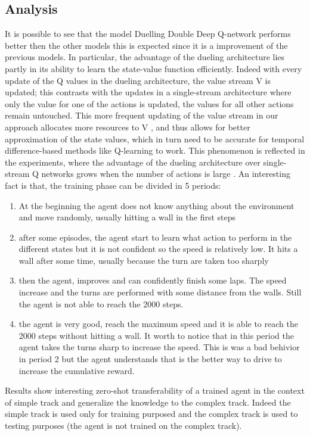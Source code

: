 \documentclass[14pt]{extarticle}
\def\sp{\vspace{5pt}}
\def\pp{\vspace{10pt}\newline}
\def\ppn{\vspace{10pt}}
\begin{document}
\begin{flushleft}
\subsection{Analysis}
\sp
It is possible to see that the model Duelling Double Deep Q-network performs better then the other models this is expected since it is a improvement of the previous models. 
\pp
In particular, the advantage of the dueling architecture lies partly in its ability to learn the state-value function efficiently. Indeed with every update of the Q values in the dueling architecture, the value stream V is updated; this contrasts with the updates in a single-stream architecture where only the value for one of the actions is updated, the values for all other actions remain untouched. This more frequent updating of the value stream in our approach allocates more resources to V , and thus allows for better approximation of the state values, which in turn need to be accurate for temporal difference-based methods like Q-learning to work. This phenomenon is reflected in the experiments, where the advantage of the dueling architecture over single-stream Q networks grows when the number of actions is large \cite{DDDQN1}.
\pp
An interesting fact is that, the training phase can be divided in 5 periods:
\begin{enumerate}
\item At the beginning the agent does not know anything about the environment and move randomly, usually hitting a wall in the first steps
\item after some episodes, the agent start to learn what action to perform in the different states but it is not confident so the speed is relatively low. It hits a wall after some time, usually because the turn are taken too sharply
\item then the agent, improves and can confidently finish some laps. The speed increase and the turns are performed with some distance from the walls. Still the agent is not able to reach the 2000 steps.
\item the agent is very good, reach the maximum speed and it is able to reach the 2000 steps without hitting a wall. It worth to notice that in this period the agent takes the turns sharp to increase the speed. This is was a bad behivior in period 2 but the agent understands that is the better way to drive to increase the cumulative reward.
\end{enumerate}
\ppn
Results show interesting zero-shot transferability \cite{Zero-shot} of a trained agent in the context of simple track and generalize the knowledge to the complex track. Indeed the simple track is used only for training purposed and the complex track is used to testing purposes (the agent is not trained on the complex track).

\end{flushleft}
\end{document}
